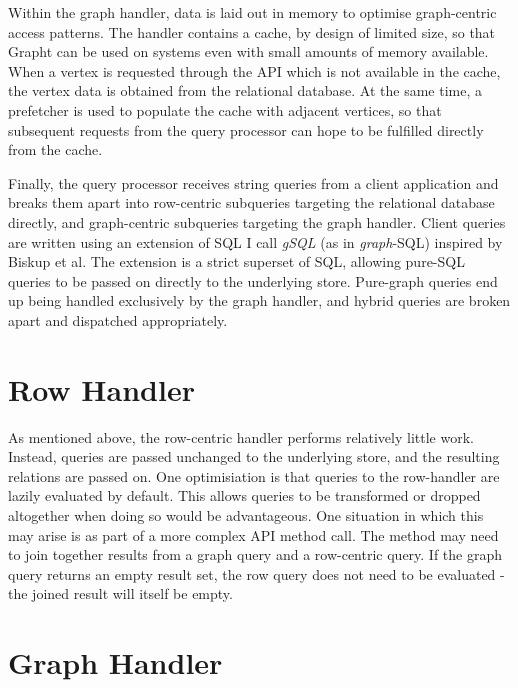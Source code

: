 Within the graph handler, data is laid out in memory to optimise graph-centric
access patterns. The handler contains a cache, by design of limited size, so
that Grapht can be used on systems even with small amounts of memory
available. When a vertex is requested through the API which is not available
in the cache, the vertex data is obtained from the relational database. At the
same time, a prefetcher is used to populate the cache with adjacent vertices,
so that subsequent requests from the query processor can hope to be fulfilled
directly from the cache.

Finally, the query processor receives string queries from a client application
and breaks them apart into row-centric subqueries targeting the relational
database directly, and graph-centric subqueries targeting the graph handler.
Client queries are written using an extension of SQL I call \textit{gSQL} (as
in \textit{graph}-SQL) inspired by Biskup et al\cite{gSQL}. The extension is a
strict superset of SQL, allowing pure-SQL queries to be passed on directly to
the underlying store. Pure-graph queries end up being handled exclusively by
the graph handler, and hybrid queries are broken apart and dispatched
appropriately.






\section{Row Handler}

As mentioned above, the row-centric handler performs relatively little work.
Instead, queries are passed unchanged to the underlying store, and the
resulting relations are passed on. One optimisiation is that queries to the
row-handler are  lazily evaluated by default. This allows queries to be
transformed or dropped altogether when doing so would be advantageous. One
situation in which this may arise is as part of a more complex API method
call. The method may need to join together results from a graph query and a
row-centric query. If the graph query returns an empty result set, the  row
query does not need to be evaluated - the joined result will itself be empty.






\section{Graph Handler}

